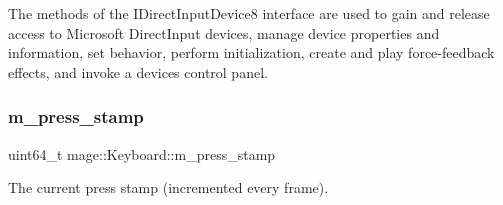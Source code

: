 The methods of the I\+Direct\+Input\+Device8 interface are used to gain and release access to Microsoft Direct\+Input devices, manage device properties and information, set behavior, perform initialization, create and play force-\/feedback effects, and invoke a device\textquotesingle{}s control panel. \hypertarget{classmage_1_1_keyboard_a2c638a93d1f61d9d3578a0df8b6a1c39}{}\label{classmage_1_1_keyboard_a2c638a93d1f61d9d3578a0df8b6a1c39} 
\subsubsection{\texorpdfstring{m\+\_\+press\+\_\+stamp}{m\_press\_stamp}}
{\footnotesize\ttfamily uint64\+\_\+t mage\+::\+Keyboard\+::m\+\_\+press\+\_\+stamp\hspace{0.3cm}{\ttfamily [protected]}}

The current press stamp (incremented every frame). 